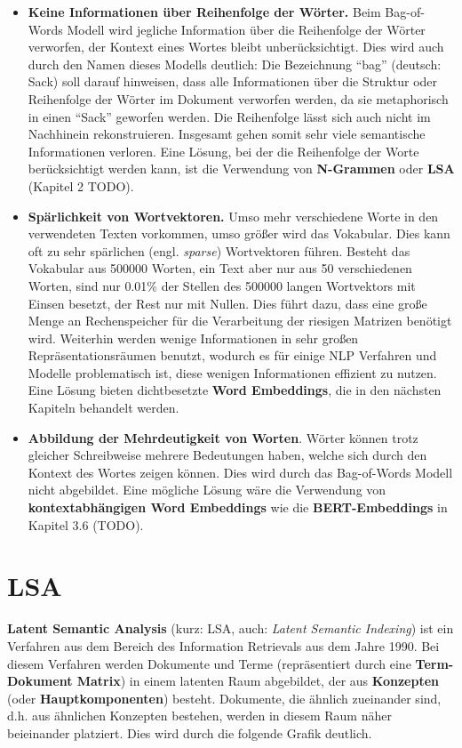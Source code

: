 \documentclass[11pt]{article}
\providecommand{\tightlist}{%
      \setlength{\itemsep}{0pt}\setlength{\parskip}{0pt}}
\begin{document}
\begin{itemize}
\tightlist
\item
  \textbf{Keine Informationen über Reihenfolge der Wörter.} Beim
  Bag-of-Words Modell wird jegliche Information über die Reihenfolge der
  Wörter verworfen, der Kontext eines Wortes bleibt unberücksichtigt.
  Dies wird auch durch den Namen dieses Modells deutlich: Die
  Bezeichnung ``bag'' (deutsch: Sack) soll darauf hinweisen, dass alle
  Informationen über die Struktur oder Reihenfolge der Wörter im
  Dokument verworfen werden, da sie metaphorisch in einen ``Sack''
  geworfen werden. Die Reihenfolge lässt sich auch nicht im Nachhinein
  rekonstruieren. Insgesamt gehen somit sehr viele semantische
  Informationen verloren. Eine Lösung, bei der die Reihenfolge der Worte
  berücksichtigt werden kann, ist die Verwendung von \textbf{N-Grammen}
  oder \textbf{LSA} (Kapitel 2 TODO).
\item
  \textbf{Spärlichkeit von Wortvektoren.} Umso mehr verschiedene Worte
  in den verwendeten Texten vorkommen, umso größer wird das Vokabular.
  Dies kann oft zu sehr spärlichen (engl. \emph{sparse}) Wortvektoren
  führen. Besteht das Vokabular aus 500000 Worten, ein Text aber nur aus
  50 verschiedenen Worten, sind nur 0.01\% der Stellen des 500000 langen
  Wortvektors mit Einsen besetzt, der Rest nur mit Nullen. Dies führt
  dazu, dass eine große Menge an Rechenspeicher für die Verarbeitung der
  riesigen Matrizen benötigt wird. Weiterhin werden wenige Informationen
  in sehr großen Repräsentationsräumen benutzt, wodurch es für einige
  NLP Verfahren und Modelle problematisch ist, diese wenigen
  Informationen effizient zu nutzen. Eine Lösung bieten dichtbesetzte
  \textbf{Word Embeddings}, die in den nächsten Kapiteln behandelt
  werden.
\item
  \textbf{Abbildung der Mehrdeutigkeit von Worten}. Wörter können trotz
  gleicher Schreibweise mehrere Bedeutungen haben, welche sich durch den
  Kontext des Wortes zeigen können. Dies wird durch das Bag-of-Words
  Modell nicht abgebildet. Eine mögliche Lösung wäre die Verwendung von
  \textbf{kontextabhängigen Word Embeddings} wie die
  \textbf{BERT-Embeddings} in Kapitel 3.6 (TODO).
\end{itemize}

    \hypertarget{lsa}{%
\section{LSA}\label{lsa}}

\textbf{Latent Semantic Analysis} (kurz: LSA, auch: \emph{Latent
Semantic Indexing}) ist ein Verfahren aus dem Bereich des Information
Retrievals aus dem Jahre 1990. Bei diesem Verfahren werden Dokumente und
Terme (repräsentiert durch eine \textbf{Term-Dokument Matrix}) in einem
latenten Raum abgebildet, der aus \textbf{Konzepten} (oder
\textbf{Hauptkomponenten}) besteht. Dokumente, die ähnlich zueinander
sind, d.h. aus ähnlichen Konzepten bestehen, werden in diesem Raum näher
beieinander platziert. Dies wird durch die folgende Grafik deutlich.
\end{document}
